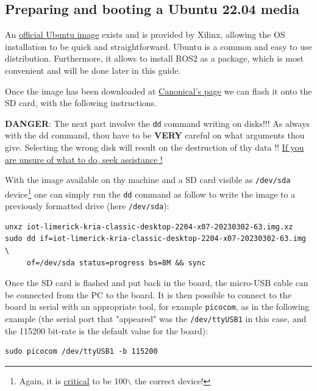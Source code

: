 \documentclass[10pt]{article}
\begin{document}
\subsection{Preparing and booting a Ubuntu 22.04 media}
\label{sec:orga04efe6}
An \href{https://ubuntu.com/download/amd-xilinx}{official Ubuntu image} exists and is
provided by Xilinx, allowing the OS installation to be quick and
straightforward.
Ubuntu is a common and easy to use distribution. Furthermore,
it allows to install ROS2 as a package, which is most convenient and will be
done later in this guide.

Once the image has been downloaded at \href{https://ubuntu.com/download/amd-xilinx}{Canonical's page}
we can flash it onto the SD card, with the following instructions.

\begin{tcolorbox}[colback=red!5!white,colframe=red!75!black]
\textbf{DANGER}: The next part involve the \texttt{dd} command writing on disks!!!
As always with the dd command, thou have to be \textbf{VERY} careful on what arguments
thou give. Selecting the wrong disk will result on the destruction of
thy data !!
\uline{If you are unsure of what to do, seek assistance !}
\end{tcolorbox}

With the image available on thy machine and a SD card visible as \texttt{/dev/sda} device\footnote{Again, it is \uline{critical} to be 100$\backslash$%
the correct device!}
one can simply run the \texttt{dd} command as follow to write the image to a previously formatted drive (here \texttt{/dev/sda}):

\begin{verbatim}
unxz iot-limerick-kria-classic-desktop-2204-x07-20230302-63.img.xz
sudo dd if=iot-limerick-kria-classic-desktop-2204-x07-20230302-63.img \
     of=/dev/sda status=progress bs=8M && sync
\end{verbatim}


Once the SD card is flashed and put back in the board, the micro-USB cable can be
connected from the PC to the board. It is then possible to
connect to the board in serial with an appropriate tool, for example \texttt{picocom},
as in the following example (the serial port that "appeared" was the \texttt{/dev/ttyUSB1} in this case,
and the 115200 bit-rate is the default value for the board):

\begin{verbatim}
sudo picocom /dev/ttyUSB1 -b 115200
\end{verbatim}
\end{document}

